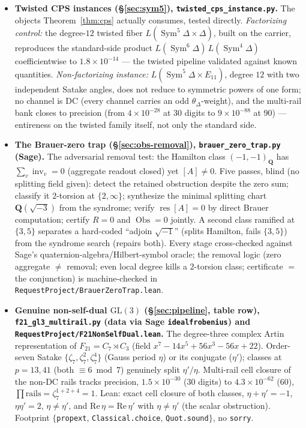 \documentclass[11pt]{article}
\theoremstyle{definition}
\newcommand{\Sym}{\operatorname{Sym}}
\begin{document}
\begin{itemize}
\item \textbf{Twisted CPS instances (\S\ref{sec:sym5}), \texttt{twisted\_cps\_instance.py}.} The objects
Theorem~\ref{thm:cps} actually consumes, tested directly. \emph{Factorizing control:} the degree-$12$ twisted
fiber $L(\Sym^5\Delta\times\Delta)$, built on the carrier, reproduces the standard-side product
$L(\Sym^6\Delta)\,L(\Sym^4\Delta)$ coefficientwise to $1.8\times10^{-14}$ --- the twisted pipeline validated
against known quantities. \emph{Non-factorizing instance:} $L(\Sym^5\Delta\times E_{11})$, degree $12$ with two
independent Satake angles, does not reduce to symmetric powers of one form; no channel is DC (every channel
carries an odd $\theta_\Delta$-weight), and the multi-rail bank closes to precision (from $4\times10^{-28}$ at
$30$ digits to $9\times10^{-88}$ at $90$) --- entireness on the twisted family itself, not only the standard side.

\item \textbf{The Brauer-zero trap (\S\ref{sec:obs-removal}), \texttt{brauer\_zero\_trap.py} (Sage).} The
adversarial removal test: the Hamilton class $(-1,-1)_{\mathbf Q}$ has $\sum_v\operatorname{inv}_v=0$ (aggregate
readout closed) yet $[A]\neq0$. Five passes, blind (no splitting field given): detect the retained obstruction
despite the zero sum; classify it $2$-torsion at $\{2,\infty\}$; synthesize the minimal splitting chart
$\mathbf Q(\sqrt{-3})$ from the syndrome; verify $\operatorname{res}[A]=0$ by direct Brauer computation; certify
$R{=}0$ and $\operatorname{Obs}{=}0$ jointly. A second class ramified at $\{3,5\}$ separates a hard-coded
``adjoin $\sqrt{-1}$'' (splits Hamilton, fails $\{3,5\}$) from the syndrome search (repairs both). Every stage
cross-checked against Sage's quaternion-algebra/Hilbert-symbol oracle; the removal logic (zero aggregate $\ne$ removal; even local degree kills a $2$-torsion class; certificate $=$ the conjunction) is machine-checked in \texttt{RequestProject/BrauerZeroTrap.lean}.

\item \textbf{Genuine non-self-dual $\mathrm{GL}(3)$ (\S\ref{sec:pipeline}, table row), \texttt{f21\_gl3\_multirail.py} (data via Sage \texttt{idealfrobenius}) and \texttt{RequestProject/F21NonSelfDual.lean}.} The degree-three complex Artin representation of $F_{21}=C_7\rtimes C_3$ (field $x^7-14x^5+56x^3-56x+22$). Order-seven Satake $\{\zeta_7,\zeta_7^2,\zeta_7^4\}$ (Gauss period $\eta$) or its conjugate ($\eta'$); classes at $p=13,41$ (both $\equiv6\bmod7$) genuinely split $\eta'/\eta$. Multi-rail cell closure of the non-DC rails tracks precision, $1.5\times10^{-30}$ (30 digits) to $4.3\times10^{-62}$ (60), $\prod\text{rails}=\zeta_7^{1+2+4}=1$. Lean: exact cell closure of both classes, $\eta+\eta'=-1$, $\eta\eta'=2$, $\eta\ne\eta'$, and $\mathrm{Re}\,\eta=\mathrm{Re}\,\eta'$ with $\eta\ne\eta'$ (the scalar obstruction). Footprint $\{$\texttt{propext}, \texttt{Classical.choice}, \texttt{Quot.sound}$\}$, no \texttt{sorry}.


\end{itemize}
\end{document}
